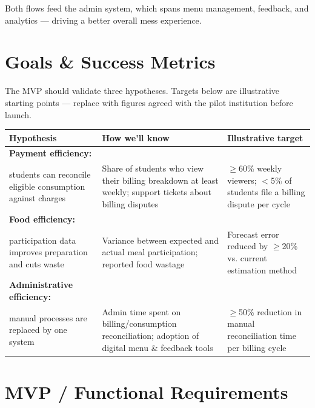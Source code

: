\documentclass[12pt,a4paper]{article}
\begin{document}
Both flows feed the admin system, which spans menu management, feedback, and
analytics --- driving a better overall mess experience.


\section{Goals \& Success Metrics}

The MVP should validate three hypotheses. Targets below are illustrative
starting points --- replace with figures agreed with the pilot institution
before launch.

\begin{center}
\small
\begin{tabularx}{0.99\textwidth}{L{0.27\textwidth} L{0.37\textwidth} Y}
\toprule
\textbf{Hypothesis} & \textbf{How we'll know} & \textbf{Illustrative target}\\
\midrule
\textbf{Payment efficiency:}\\
students can reconcile eligible consumption against charges &
Share of students who view their billing breakdown at least weekly;
support tickets about billing disputes &
$\geq$60\% weekly viewers; $<$5\% of students file a billing dispute per cycle\\
\addlinespace
\textbf{Food efficiency:}\\
participation data improves preparation and cuts waste &
Variance between expected and actual meal participation; reported food wastage &
Forecast error reduced by $\geq$20\% vs. current estimation method\\
\addlinespace
\textbf{Administrative efficiency:}\\
manual processes are replaced by one system &
Admin time spent on billing/consumption reconciliation; adoption of digital
menu \& feedback tools &
$\geq$50\% reduction in manual reconciliation time per billing cycle\\
\bottomrule
\end{tabularx}
\end{center}


\section{MVP / Functional Requirements}
\end{document}
